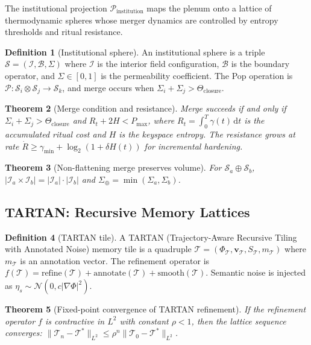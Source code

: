 \documentclass[12pt, a4paper]{article}
\theoremstyle{plain}
\newtheorem{theorem}{Theorem}[section]
\theoremstyle{definition}
\newtheorem{definition}[theorem]{Definition}
\theoremstyle{remark}
\newcommand{\vfield}{\mathbf{v}}
\newcommand{\Proj}[1]{\mathcal{P}_{#1}}
\begin{document}
The institutional projection $\Proj{\mathrm{institution}}$ maps the plenum onto a
lattice of thermodynamic spheres whose merger dynamics are controlled by entropy
thresholds and ritual resistance.

\begin{definition}[Institutional sphere]
An institutional sphere is a triple $\mathcal{S} = (\mathcal{I}, \mathcal{B}, \Sigma)$
where $\mathcal{I}$ is the interior field configuration, $\mathcal{B}$ is the boundary
operator, and $\Sigma \in [0,1]$ is the permeability coefficient.  The Pop operation
is $\mathcal{P}: \mathcal{S}_i \otimes \mathcal{S}_j \to \mathcal{S}_k$, and merge
occurs when $\Sigma_i + \Sigma_j > \Theta_{\mathrm{closure}}$.
\end{definition}

\begin{theorem}[Merge condition and resistance]
\label{thm:merge}
Merge succeeds if and only if $\Sigma_i + \Sigma_j > \Theta_{\mathrm{closure}}$ and
$R_t + 2H < P_{\max}$, where $R_t = \int_0^T\gamma(t)\,\mathrm{d}t$ is the accumulated
ritual cost and $H$ is the keyspace entropy.  The resistance grows at rate
$\dot{R} \geq \gamma_{\min} + \log_2(1 + \delta H(t))$ for incremental hardening.
\end{theorem}

\begin{theorem}[Non-flattening merge preserves volume]
For $\mathcal{S}_a \oplus \mathcal{S}_b$,
$|\mathcal{I}_a \times \mathcal{I}_b| = |\mathcal{I}_a|\cdot|\mathcal{I}_b|$
and $\Sigma_\oplus = \min(\Sigma_a,\Sigma_b)$.
\end{theorem}

\subsection{TARTAN: Recursive Memory Lattices}

\begin{definition}[TARTAN tile]
A TARTAN (Trajectory-Aware Recursive Tiling with Annotated Noise) memory tile is a
quadruple $\mathcal{T} = (\Phi_\mathcal{T}, \vfield_\mathcal{T}, S_\mathcal{T}, m_\mathcal{T})$
where $m_\mathcal{T}$ is an annotation vector.  The refinement operator is
$f(\mathcal{T}) = \mathrm{refine}(\mathcal{T}) + \mathrm{annotate}(\mathcal{T}) + \mathrm{smooth}(\mathcal{T})$.
Semantic noise is injected as $\eta_s \sim \mathcal{N}(0, c|\nabla\Phi|^2)$.
\end{definition}

\begin{theorem}[Fixed-point convergence of TARTAN refinement]
\label{thm:tartan}
If the refinement operator $f$ is contractive in $L^2$ with constant $\rho < 1$, then
the lattice sequence converges:
$\|\mathcal{T}_n - \mathcal{T}^*\|_{L^2} \leq \rho^n\|\mathcal{T}_0 - \mathcal{T}^*\|_{L^2}$.
\end{theorem}
\end{document}

